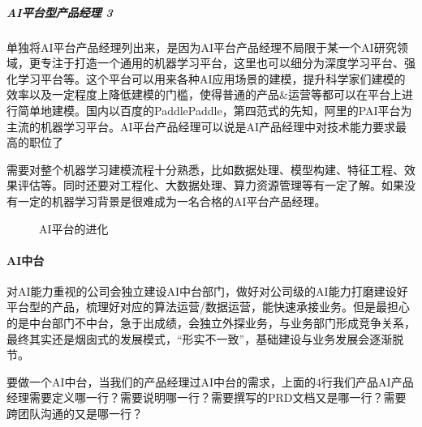 \documentclass[letterpaper,11pt,english]{sphinxmanual}
\begin{document}
\subparagraph{AI平台型产品经理 3\sphinxfootnotemark[100]}
\label{\detokenize{chapter_introduction/platform:ai-3}}%
\begin{footnotetext}[100]\sphinxAtStartFootnote
{}
%
\end{footnotetext}\ignorespaces 
单独将AI平台产品经理列出来，是因为AI平台产品经理不局限于某一个AI研究领域，更专注于打造一个通用的机器学习平台，这里也可以细分为深度学习平台、强化学习平台等。这个平台可以用来各种AI应用场景的建模，提升科学家们建模的效率以及一定程度上降低建模的门槛，使得普通的产品\&运营等都可以在平台上进行简单地建模。国内以百度的Paddle\sphinxhyphen{}Paddle，第四范式的先知，阿里的PAI平台为主流的机器学习平台。AI平台产品经理可以说是AI产品经理中对技术能力要求最高的职位了

需要对整个机器学习建模流程十分熟悉，比如数据处理、模型构建、特征工程、效果评估等。同时还要对工程化、大数据处理、算力资源管理等有一定了解。如果没有一定的机器学习背景是很难成为一名合格的AI平台产品经理。

\begin{figure}[H]
\centering
\capstart

\noindent{}
\caption{AI平台的进化}\label{\detokenize{chapter_introduction/platform:id12}}\end{figure}


\paragraph{AI中台}
\label{\detokenize{chapter_introduction/platform:id6}}
对AI能力重视的公司会独立建设AI中台部门，做好对公司级的AI能力打磨建设好平台型的产品，梳理好对应的算法运营/数据运营，能快速承接业务。但是最担心的是中台部门不中台，急于出成绩，会独立外探业务，与业务部门形成竞争关系，最终其实还是烟囱式的发展模式，“形实不一致”，基础建设与业务发展会逐渐脱节。%
\begin{footnote}[101]\sphinxAtStartFootnote
{}
%
\end{footnote}


要做一个AI中台，当我们的产品经理过AI中台的需求，上面的4行我们产品AI产品经理需要定义哪一行？需要说明哪一行？需要撰写的PRD文档又是哪一行？需要跨团队沟通的又是哪一行？%
\begin{footnote}[102]\sphinxAtStartFootnote
{}
%
\end{footnote}
\end{document}
